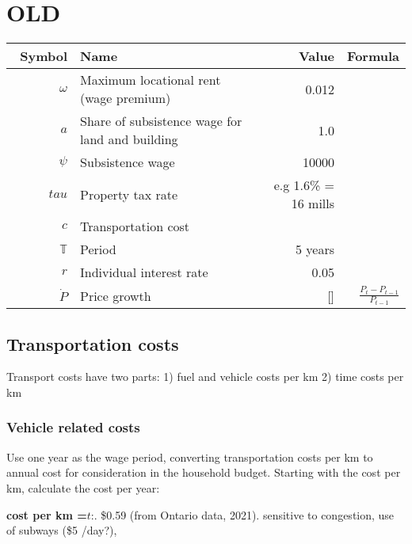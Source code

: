 \section{OLD}

\renewcommand{\arraystretch}{1.5}
\begin{tabular}{rlrr}\
Symbol         & Name                                 & Value      & Formula  \\ \hline
$\omega$  & Maximum locational rent (wage premium) & 0.012        \\
$a$       & Share of subsistence wage for land and building & 1.0 \\
$\psi$    & Subsistence wage & 10000 \\
$tau$     & Property tax rate &  e.g 1.6\% = 16 mills           & \\
$c$       & Transportation cost & \\
$\mathbb{T}$       & Period & 5 years      \\
$r$       & Individual interest rate & 0.05 \\\
$\dot P $      & Price growth                         & []         & $\frac{P_t-P_{t-1}}{P_{t-1}}$\\
\end{tabular}
\renewcommand{\arraystretch}{1.0}





\subsection{Transportation costs}
Transport costs have two parts:
1) fuel and vehicle costs per km
2) time costs per km

\subsubsection{Vehicle related costs}
Use one year as the wage period, converting transportation costs per km to annual cost for consideration in the household budget. Starting with the cost per km, calculate the cost per year:

\textbf{cost per km =$\textit{t}$}:. \$0.59   (from  Ontario data, 2021). sensitive to congestion, use of subways (\$5 /day?), 

